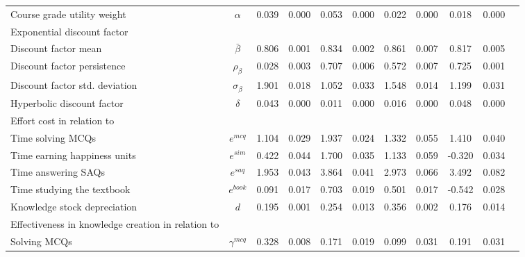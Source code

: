\documentclass[12pt]{article}
\begin{document}
\begin{landscape}
\begin{table}[htbp]
\begin{tabular}{lcccccccccc}
                        Course grade utility weight &                       $\alpha$ & 0.039 & 0.000 & 0.053 & 0.000 & 0.022 & 0.000 &  0.018 & 0.000 \\
                 Exponential discount factor & & & & & & & & & \\
\hspace{0.4cm}Discount factor mean &                  $\bar{\beta}$ & 0.806 & 0.001 & 0.834 & 0.002 & 0.861 & 0.007 &  0.817 & 0.005 \\
          \hspace{0.4cm}Discount factor persistence &                 $\rho_{\beta}$ & 0.028 & 0.003 & 0.707 & 0.006 & 0.572 & 0.007 &  0.725 & 0.001 \\
       \hspace{0.4cm}Discount factor std. deviation &               $\sigma_{\beta}$ & 1.901 & 0.018 & 1.052 & 0.033 & 1.548 & 0.014 &  1.199 & 0.031 \\
                         Hyperbolic discount factor &                       $\delta$ & 0.043 & 0.000 & 0.011 & 0.000 & 0.016 & 0.000 &  0.048 & 0.000 \\
                    \hline
Effort cost in relation to & & & & & & & & & \\
\hspace{0.4cm}Time solving MCQs &                      $e^{mcq}$ & 1.104 & 0.029 & 1.937 & 0.024 & 1.332 & 0.055 &  1.410 & 0.040 \\
         \hspace{0.4cm}Time earning happiness units &                      $e^{sim}$ & 0.422 & 0.044 & 1.700 & 0.035 & 1.133 & 0.059 & -0.320 & 0.034 \\
                  \hspace{0.4cm}Time answering SAQs &                      $e^{saq}$ & 1.953 & 0.043 & 3.864 & 0.041 & 2.973 & 0.066 &  3.492 & 0.082 \\
           \hspace{0.4cm}Time studying the textbook &                     $e^{book}$ & 0.091 & 0.017 & 0.703 & 0.019 & 0.501 & 0.017 & -0.542 & 0.028 \\
                       Knowledge stock depreciation &                            $d$ & 0.195 & 0.001 & 0.254 & 0.013 & 0.356 & 0.002 &  0.176 & 0.014 \\
                         \hline
Effectiveness in knowledge creation in relation to & & & & & & & & & \\
\hspace{0.4cm}Solving MCQs &                 $\gamma^{mcq}$ & 0.328 & 0.008 & 0.171 & 0.019 & 0.099 & 0.031 &  0.191 & 0.031 \\

\end{tabular}
\end{table}
\end{landscape}
\end{document}
